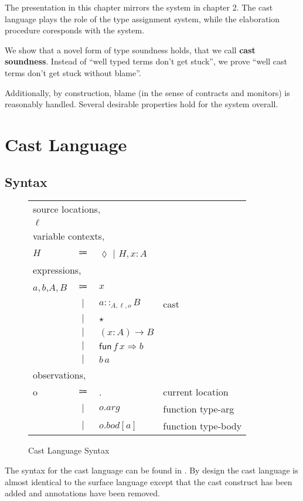 The presentation in this chapter mirrors the system in chapter 2.
The cast language plays the role of the type assignment system, while the elaboration procedure coresponds with the \bidir system.

We show that a novel form of type soundness holds, that we call \textbf{cast soundness}.
Instead of ``well typed terms don't get stuck'', we prove ``well cast terms don't get stuck without blame''. 

Additionally, by construction, blame (in the sense of contracts and monitors) is reasonably handled.
Several desirable properties hold for the system overall. 

\section{Cast Language}

\subsection{Syntax}

\begin{figure}
\begin{tabular}{lcll}
\multicolumn{4}{l}{source locations,}\tabularnewline
$\ensuremath{\ell}$ &  &  & \tabularnewline
\multicolumn{4}{l}{variable contexts,}\tabularnewline
$H$ & $\Coloneqq$ & $\lozenge$ $|$ $H,x:A$ & \tabularnewline
\multicolumn{4}{l}{expressions,}\tabularnewline
$a,b$,$A,B$ & $\Coloneqq$ & $x$ & \tabularnewline
 & $|$ & $a::_{A,\ensuremath{\ell},o}B$ & cast\tabularnewline
 & $|$ & $\star$ & \tabularnewline
 & $|$ & $\left(x:A\right)\rightarrow B$ & \tabularnewline
 & $|$ & $\mathsf{fun}\,f\,x\Rightarrow b$ & \tabularnewline
 & $|$ & $b\,a$ & \tabularnewline
\multicolumn{4}{l}{observations,}\tabularnewline
o & $\Coloneqq$ & . & current location\tabularnewline
 & $|$ & $o.arg$ & function type-arg\tabularnewline
 & $|$ & $o.bod[a]$ & function type-body\tabularnewline
\end{tabular}



\caption{Cast Language Syntax}
\label{fig:cast-pre-syntax}
\end{figure}

The syntax for the cast language can be found in .
By design the cast language is almost identical to the surface language except that the cast construct has been added and annotations have been removed.

